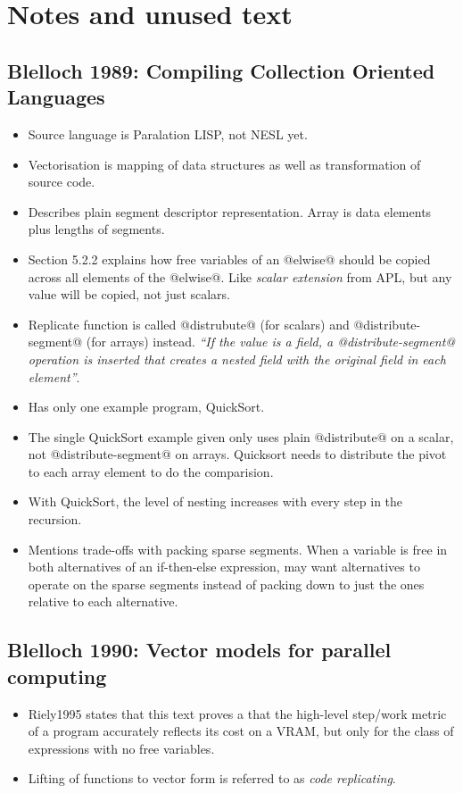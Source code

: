 
\clearpage{}
\section{Notes and unused text}

\subsection{
        \cite{Blelloch:compiling-collection-oriented-languages}
        Blelloch 1989: Compiling Collection Oriented Languages}
\begin{itemize}
\item	Source language is Paralation LISP, not NESL yet.
\item	Vectorisation is mapping of data structures as well as transformation of source code.
\item	Describes plain segment descriptor representation. Array is data elements plus lengths of segments.
\item	Section 5.2.2 explains how free variables of an @elwise@ should be copied across all elements of the @elwise@. Like \emph{scalar extension} from APL, but any value will be copied, not just scalars.
\item	Replicate function is called @distrubute@ (for scalars) and @distribute-segment@ (for arrays) instead. \emph{``If the value is a field, a @distribute-segment@ operation is inserted that creates a nested field with the original field in each element''}.
\item	Has only one example program, QuickSort.
\item	The single QuickSort example given only uses plain @distribute@ on a scalar, not @distribute-segment@ on arrays. Quicksort needs to distribute the pivot to each array element to do the comparision.
\item	With QuickSort, the level of nesting increases with every step in the recursion.
\item	Mentions trade-offs with packing sparse segments. When a variable is free in both alternatives of an if-then-else expression, may want alternatives to operate on the sparse segments instead of packing down to just the ones relative to each alternative.
\end{itemize}


\subsection{Blelloch 1990: Vector models for parallel computing}
\begin{itemize}
\item	Riely1995 states that this text proves a that the high-level step/work metric of a program accurately reflects its cost on a VRAM, but only for the class of expressions with no free variables.
\item   Lifting of functions to vector form is referred to as \emph{code replicating}. 
\end{itemize}


